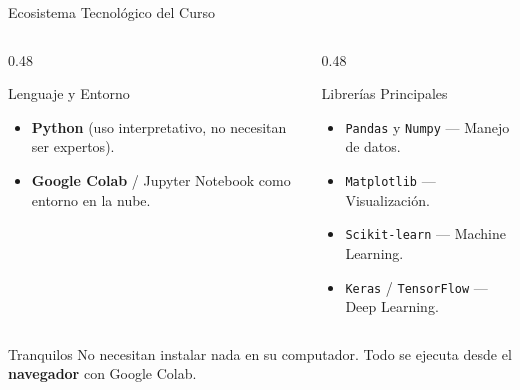 \documentclass[aspectratio=169]{beamer}
\newcommand{\tech}[1]{\texttt{\textcolor{mainColor}{#1}}}
\begin{document}
\begin{frame}{Ecosistema Tecnológico del Curso}
  \begin{columns}[T]
    \begin{column}{0.48\textwidth}
      \begin{block}{\faPython\enspace Lenguaje y Entorno}
        \small
        \begin{itemize}\setlength\itemsep{3pt}
          \item \textbf{Python} (uso interpretativo, no necesitan
                ser expertos).
          \item \textbf{Google Colab} / Jupyter Notebook como
                entorno en la nube.
        \end{itemize}
      \end{block}
    \end{column}
    \begin{column}{0.48\textwidth}
      \begin{block}{\faBoxes\enspace Librerías Principales}
        \small
        \begin{itemize}\setlength\itemsep{3pt}
          \item \tech{Pandas} y \tech{Numpy} --- Manejo de datos.
          \item \tech{Matplotlib} --- Visualización.
          \item \tech{Scikit-learn} --- Machine Learning.
          \item \tech{Keras} / \tech{TensorFlow} --- Deep Learning.
        \end{itemize}
      \end{block}
    \end{column}
  \end{columns}
  \vspace{0.3cm}
  \begin{alertblock}{\faLightbulb\enspace Tranquilos}
    \centering\small
    No necesitan instalar nada en su computador.
    Todo se ejecuta desde el \textbf{navegador} con Google Colab.
  \end{alertblock}
\end{frame}

\end{document}
